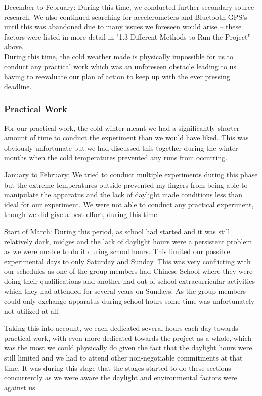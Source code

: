 \documentclass[14pt]{article}
\begin{document}
December to February: During this time,  we conducted further secondary source research. We also continued searching for accelerometers and Bluetooth GPS's until this was abandoned due to many issues we foreseen would arise -- these factors were listed in more detail in "1.3 Different Methods to Run the Project" above.\\

During this time, the cold weather made is physically impossible for us to conduct any practical work which was an unforeseen obstacle leading to us having to reevaluate our plan of action to keep up with the ever pressing deadline.
\subsubsection{Practical Work}
For our practical work, the cold winter meant we had a significantly shorter amount of time to conduct the experiment than we would have liked. This was obviously unfortunate but we had discussed this together during the winter months when the cold temperatures prevented any runs from occurring.

January to February: We tried to conduct multiple experiments during this phase but the extreme temperatures outside prevented my fingers from being able to manipulate the apparatus and the lack of daylight made conditions less than ideal for our experiment. We were not able to conduct any practical experiment, though we did give a best effort, during this time. 

Start of March: During this period, as school had started and it was still relatively dark, midges and the lack of daylight hours were a persistent problem as we were unable to do it during school hours. This limited our possible experimental days to only Saturday and Sunday.
This was very conflicting with our schedules as one of the group members had Chinese School where they were doing their qualifications and another had out-of-school extracurricular activities which they had attended for several years on Sundays. As the group members could only exchange apparatus during school hours some time was unfortunately not utilized at all.

Taking this into account, we each dedicated several hours each day towards practical work, with even more dedicated towards the project as a whole, which was the most we could physically do given the fact that the daylight hours were still limited and we had to attend other non-negotiable commitments at that time. It was during this stage that the stages started to do these sections concurrently as we were aware the daylight and environmental factors were against us. 
\end{document}
